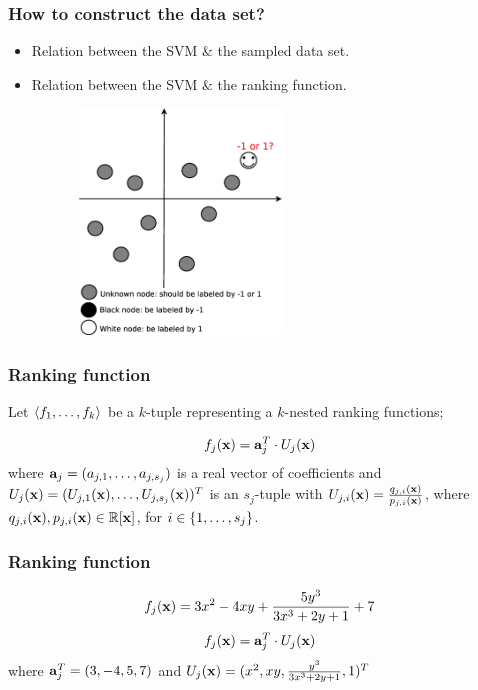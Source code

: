 \begin{frame}
\frametitle{How to construct the data set?}
\begin{itemize}
\item Relation between the SVM \& the sampled data set.
\item Relation between the SVM \& the ranking function.
\end{itemize}
\begin{figure}  %
  \includegraphics[width=7cm,height = 6cm]{pictures/Data}  
\end{figure}
\end{frame}
\begin{frame}
\frametitle{Ranking function}
Let $\langle f_{1}, \dotsc, f_{k} \rangle$ be a $k$-tuple representing a $k$-nested ranking functions; 

\begin{equation}
f_{j}(\mathbf{x}) = \mathbf{a}^{T}_{j} \cdot U_{j}(\mathbf{x}) \notag
\end{equation}
where $\mathbf{a}_{j} = (a_{j,1}, \dotsc, a_{j,s_{j}})$ is a real vector of coefficients and $U_{j}(\mathbf{x}) = (U_{j,1}(\mathbf{x}), \dotsc, U_{j,s_{j}}(\mathbf{x}))^{T}$ is an $s_{j}$-tuple with $U_{j,i}(\mathbf{x}) = \frac{q_{j,i}(\mathbf{x})}{p_{j,i}(\mathbf{x})}$, where $q_{j,i}(\mathbf{x}), p_{j,i}(\mathbf{x}) \in \mathbb{R}[\mathbf{x}]$, for $i \in \{1, \dotsc, s_{j}\}$.
\end{frame}
\begin{frame}
\frametitle{Ranking function}
\begin{myExample}

\begin{equation}
f_{j}(\mathbf{x}) = 3x^2 - 4xy + \frac{5y^3}{3x^3+2y+1} + 7 \notag 
\end{equation}
\hl
\begin{equation}
f_{j}(\mathbf{x}) = \mathbf{a}^{T}_{j} \cdot U_{j}(\mathbf{x})  \notag
\end{equation}
 where $\mathbf{a}^{T}_{j} = (3, -4, 5, 7)$ and $U_{j}(\mathbf{x}) = (x^2, xy, \frac{y^3}{3x^3+2y+1}, 1)^{T}$
\end{myExample}
\end{frame}

